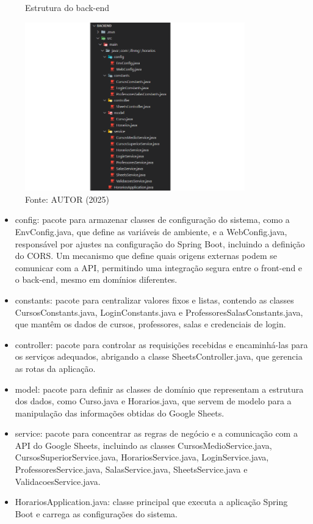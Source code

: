 \begin{figure}[htb]
    \centering
    \caption{Estrutura do back-end}
    \includegraphics[width=0.85\textwidth]{Figuras/back-1.png}
    \caption*{Fonte: AUTOR (2025)}
    \label{fig_back_1}
\end{figure}

\begin{itemize}
    \item config: pacote para armazenar classes de configuração do sistema, como a EnvConfig.java, que define as variáveis de ambiente, e a WebConfig.java, responsável por ajustes na configuração do Spring Boot, incluindo a definição do CORS. Um mecanismo que define quais origens externas podem se comunicar com a API, permitindo uma integração segura entre o front-end e o back-end, mesmo em domínios diferentes.
    \item constants: pacote para centralizar valores fixos e listas, contendo as classes CursosConstants.java, LoginConstants.java e ProfessoresSalasConstants.java, que mantêm os dados de cursos, professores, salas e credenciais de login.
    \item controller: pacote para controlar as requisições recebidas e encaminhá-las para os serviços adequados, abrigando a classe SheetsController.java, que gerencia as rotas da aplicação.
    \item model: pacote para definir as classes de domínio que representam a estrutura dos dados, como Curso.java e Horarios.java, que servem de modelo para a manipulação das informações obtidas do Google Sheets.
    \item service: pacote para concentrar as regras de negócio e a comunicação com a API do Google Sheets, incluindo as classes CursosMedioService.java, CursosSuperiorService.java, HorariosService.java, LoginService.java, ProfessoresService.java, SalasService.java, SheetsService.java e ValidacoesService.java.
    \item HorariosApplication.java: classe principal que executa a aplicação Spring Boot e carrega as configurações do sistema.
\end{itemize}

